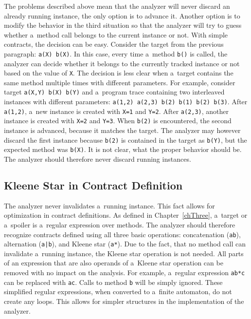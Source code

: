 The problems described above mean that the analyzer will never discard an
already running instance, the only option is to advance it. Another option is to
modify the behavior in the third situation so that the analyzer will try to
guess whether a~method call belongs to the current instance or not. With simple
contracts, the decision can be easy. Consider the target from the previous
paragraph: \texttt{a(X) b(X)}. In this case, every time a~method \texttt{b()} is
called, the analyzer can decide whether it belongs to the currently tracked
instance or not based on the value of \texttt{X}. The decision is less clear
when a~target contains the same method multiple times with different parameters.
For example, consider target \texttt{a(X,Y) b(X) b(Y)} and a~program trace
containing two interleaved instances with different parameters: \texttt{a(1,2)
a(2,3) b(2) b(1) b(2) b(3)}. After \texttt{a(1,2)}, a~new instance is created
with \texttt{X=1} and \texttt{Y=2}. After \texttt{a(2,3)}, another instance is
created with \texttt{X=2} and \texttt{Y=3}. When \texttt{b(2)} is encountered,
the second instance is advanced, because it matches the target. The analyzer may
however discard the first instance because \texttt{b(2)} is contained in the
target as \texttt{b(Y)}, but the expected method was \texttt{b(X)}. It is not
clear, what the proper behavior should be. The analyzer should therefore never
discard running instances.

\subsection{Kleene Star in Contract Definition}

The analyzer never invalidates a~running instance. This fact allows for
optimization in contract definitions. As defined in Chapter~\ref{chThree},
a~target or a~spoiler is a~regular expression over methods. The analyzer should
therefore recognize contracts defined using all three basic operations:
concatenation (\texttt{ab}), alternation (\texttt{a|b}), and Kleene star
(\texttt{a*}). Due to the fact, that no method call can invalidate a~running
instance, the Kleene star operation is not needed. All parts of an expression
that are also operands of a~Kleene star operation can be removed with no impact
on the analysis. For example, a~regular expression \texttt{ab*c} can be replaced
with \texttt{ac}. Calls to method \texttt{b} will be simply ignored. These
simplified regular expressions, when converted to a~finite automaton, do not
create any loops. This allows for simpler structures in the implementation of
the analyzer.

